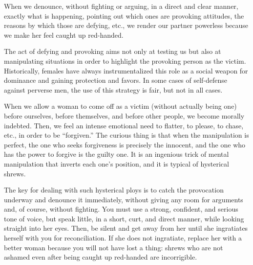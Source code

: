 \par When we denounce, without fighting or arguing, in a direct and clear manner, exactly what is happening, pointing out which ones are provoking attitudes, the reasons by which those are defying, etc., we render our partner powerless because we make her feel caught up red-handed.

\par The act of defying and provoking aims not only at testing us but also at manipulating situations in order to highlight the provoking person as the victim. Historically, females have always instrumentalized this role as a social weapon for dominance and gaining protection and favors. In some cases of self-defense against perverse men, the use of this strategy is fair, but not in all cases.

\par When we allow a woman to come off as a victim (without actually being one) before ourselves, before themselves, and before other people, we become morally indebted. Then, we feel an intense emotional need to flatter, to please, to chase, etc., in order to be \enquote{forgiven.} The curious thing is that when the manipulation is perfect, the one who seeks forgiveness is precisely the innocent, and the one who has the power to forgive is the guilty one. It is an ingenious trick of mental manipulation that inverts each one's position, and it is typical of hysterical shrews\footnotemark[30].


\par The key for dealing with such hysterical ploys is to catch the provocation underway and denounce it immediately, without giving any room for arguments and, of course, without fighting. You must use a strong, confident, and serious tone of voice, but speak little, in a short, curt, and direct manner, while looking straight into her eyes. Then, be silent and get away from her until she ingratiates herself with you for reconciliation\footnotemark[31]. If she does not ingratiate, replace her with a better woman because you will not have lost a thing: shrews who are not ashamed even after being caught up red-handed are incorrigible.



